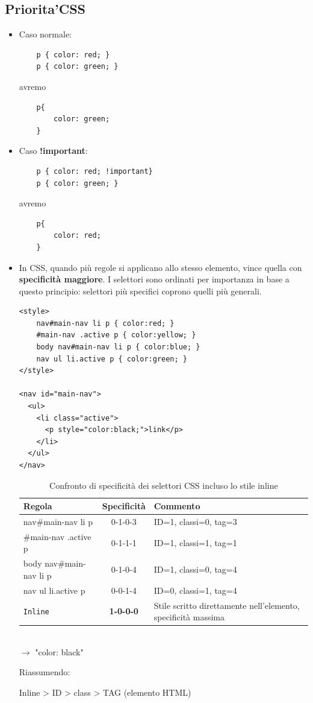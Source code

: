 \documentclass[a4paper,12pt]{article}
\begin{document}
\subsection{Priorita'CSS}
\begin{itemize}
    \item Caso normale:
\begin{lstlisting}
    p { color: red; }
    p { color: green; }
\end{lstlisting}
avremo 
\begin{lstlisting}
    p{
        color: green;
    }
\end{lstlisting}
    \item Caso \textbf{!important}:
\begin{lstlisting}
    p { color: red; !important}
    p { color: green; }
\end{lstlisting}
avremo 
\begin{lstlisting}
    p{
        color: red;
    }
\end{lstlisting}
\item In CSS, quando più regole si applicano allo stesso elemento, vince quella con \textbf{specificità maggiore}. I selettori sono ordinati per importanza in base a questo principio: selettori più specifici coprono quelli più generali.
\begin{lstlisting}
<style>
    nav#main-nav li p { color:red; }
    #main-nav .active p { color:yellow; }
    body nav#main-nav li p { color:blue; }
    nav ul li.active p { color:green; }
</style>

<nav id="main-nav">
  <ul>
    <li class="active">
      <p style="color:black;">link</p>
    </li>
  </ul>
</nav>
\end{lstlisting}
\begin{table}[h!]
\centering
\begin{tabular}{|l|c|l|}
\hline
\textbf{Regola} & \textbf{Specificità} & \textbf{Commento} \\
\hline
nav\#main-nav li p & 0-1-0-3 & ID=1, classi=0, tag=3 \\
\#main-nav .active p & 0-1-1-1 & ID=1, classi=1, tag=1 \\
body nav\#main-nav li p & 0-1-0-4 & ID=1, classi=0, tag=4 \\
nav ul li.active p & 0-0-1-4 & ID=0, classi=1, tag=4 \\
\texttt{Inline} & \textbf{1-0-0-0} & Stile scritto direttamente nell'elemento, specificità massima \\
\hline
\end{tabular}
\vspace{1em}\\
$\to$ "color: black" 
\caption{Confronto di specificità dei selettori CSS incluso lo stile inline}
\end{table}
Riassumendo:
\begin{center}
    Inline > ID > class > TAG (elemento HTML)
\end{center}
\end{itemize}
\end{document}
